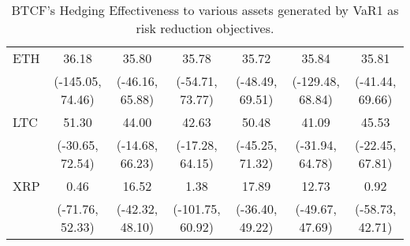 \begin{table}[t]
{\begin{tabular}{lcccccc}
ETH     &             36.18 &            35.80 &             35.78 &            35.72 &             35.84 &             35.81 \\
        &  (-145.05, 74.46) &  (-46.16, 65.88) &   (-54.71, 73.77) &  (-48.49, 69.51) &  (-129.48, 68.84) &   (-41.44, 69.66) \\
LTC     &             51.30 &            44.00 &             42.63 &            50.48 &             41.09 &             45.53 \\
        &   (-30.65, 72.54) &  (-14.68, 66.23) &   (-17.28, 64.15) &  (-45.25, 71.32) &   (-31.94, 64.78) &   (-22.45, 67.81) \\
XRP     &              0.46 &            16.52 &              1.38 &            17.89 &             12.73 &              0.92 \\
        &   (-71.76, 52.33) &  (-42.32, 48.10) &  (-101.75, 60.92) &  (-36.40, 49.22) &   (-49.67, 47.69) &   (-58.73, 42.71) \\
\bottomrule
\end{tabular}}
\caption{BTCF's Hedging Effectiveness to various assets generated by VaR1 as risk reduction objectives.}
\label{tab:VaR1HE}
\end{table}